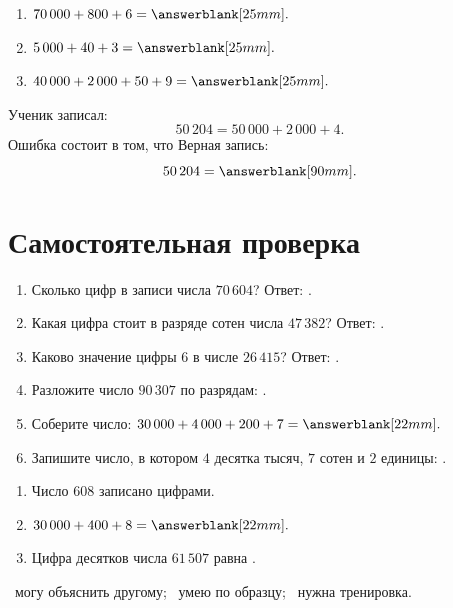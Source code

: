 \begin{fillbox}
  \begin{enumerate}
    \item \(70\,000+800+6=\answerblank[25mm].\)
    \item \(5\,000+40+3=\answerblank[25mm].\)
    \item \(40\,000+2\,000+50+9=\answerblank[25mm].\)
  \end{enumerate}
\end{fillbox}

\begin{warningbox}
  Ученик записал:
  \[
    50\,204=50\,000+2\,000+4.
  \]
  Ошибка состоит в том, что
  Верная запись:
  \[
    50\,204=\answerblank[90mm].
  \]
\end{warningbox}

\section{Самостоятельная проверка}

\begin{practicebox}
  \begin{enumerate}[label=\textbf{\arabic*.},itemsep=0.38em]
    \item Сколько цифр в записи числа \(70\,604\)?
      Ответ: \answerblank[18mm].
    \item Какая цифра стоит в разряде сотен числа \(47\,382\)?
      Ответ: \answerblank[18mm].
    \item Каково значение цифры \(6\) в числе \(26\,415\)?
      Ответ: \answerblank[23mm].
    \item Разложите число \(90\,307\) по разрядам:
      \answerblank[64mm].
    \item Соберите число: \(30\,000+4\,000+200+7=\answerblank[22mm].\)
    \item Запишите число, в котором \(4\) десятка тысяч, \(7\) сотен и
      \(2\) единицы: \answerblank[22mm].
  \end{enumerate}
\end{practicebox}

\begin{checkpointbox}
  \begin{enumerate}
    \item Число \(608\) записано \answerblank[12mm] цифрами.
    \item \(30\,000+400+8=\answerblank[22mm].\)
    \item Цифра десятков числа \(61\,507\) равна \answerblank[12mm].
  \end{enumerate}
\end{checkpointbox}

\begin{reflectionbox}
  \choicebox\ могу объяснить другому;
  \qquad
  \choicebox\ умею по образцу;
  \qquad
  \choicebox\ нужна тренировка.
\end{reflectionbox}
